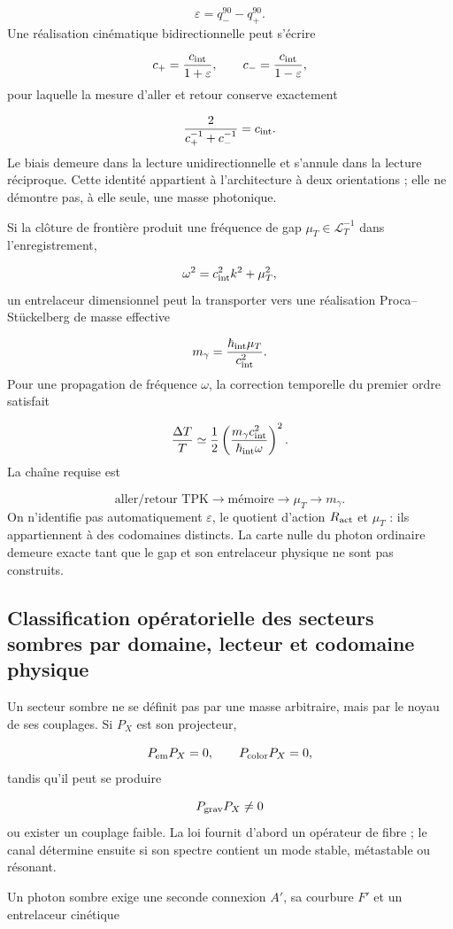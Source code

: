\[
\varepsilon=q_-^{90}-q_+^{90}.
\]
Une réalisation cinématique bidirectionnelle peut s'écrire

\[
c_+=\frac{c_{\rm int}}{1+\varepsilon},
\qquad
c_-=\frac{c_{\rm int}}{1-\varepsilon},
\]
pour laquelle la mesure d'aller et retour conserve exactement

\[
\frac{2}{c_+^{-1}+c_-^{-1}}=c_{\rm int}.
\]
Le biais demeure dans la lecture unidirectionnelle et s'annule dans la lecture réciproque. Cette identité appartient à l'architecture à deux orientations ; elle ne démontre pas, à elle seule, une masse photonique.

Si la clôture de frontière produit une fréquence de gap \(\mu_T\in\mathcal L_T^{-1}\) dans l'enregistrement,

\[
\omega^2=c_{\rm int}^{2}k^2+\mu_T^2,
\]
un entrelaceur dimensionnel peut la transporter vers une réalisation Proca--Stückelberg de masse effective

\[
m_\gamma=\frac{\hbar_{\rm int}\mu_T}{c_{\rm int}^{2}}.
\]
Pour une propagation de fréquence \(\omega\), la correction temporelle du premier ordre satisfait

\[
\frac{\Delta T}{T}
\simeq
\frac12
\left(
\frac{m_\gamma c_{\rm int}^{2}}
     {\hbar_{\rm int}\omega}
\right)^2.
\]
La chaîne requise est

\[
\text{aller/retour TPK}
\longrightarrow
\text{mémoire}
\longrightarrow
\mu_T
\longrightarrow
m_\gamma.
\]
On n'identifie pas automatiquement \(\varepsilon\), le quotient d'action \(R_{\rm act}\) et \(\mu_T\) : ils appartiennent à des codomaines distincts. La carte nulle du photon ordinaire demeure exacte tant que le gap et son entrelaceur physique ne sont pas construits.

\subsection{Classification opératorielle des secteurs sombres par domaine, lecteur et codomaine physique}
Un secteur sombre ne se définit pas par une masse arbitraire, mais par le noyau de ses couplages. Si \(P_X\) est son projecteur,

\[
P_{\rm em}P_X=0,
\qquad
P_{\rm color}P_X=0,
\]
tandis qu'il peut se produire

\[
P_{\rm grav}P_X\ne0
\]
ou exister un couplage faible. La loi fournit d'abord un opérateur de fibre ; le canal détermine ensuite si son spectre contient un mode stable, métastable ou résonant.

Un photon sombre exige une seconde connexion \(A'\), sa courbure \(F'\) et un entrelaceur cinétique

